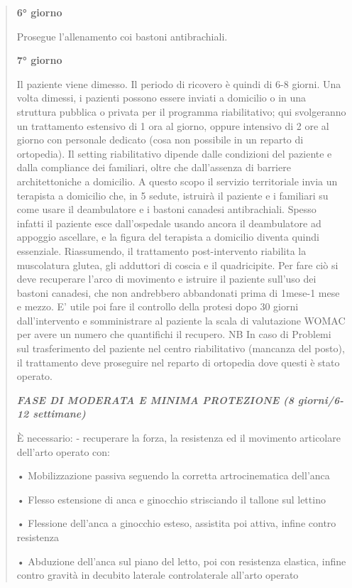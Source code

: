 \documentclass[]{article}
\begin{document}
\begin{quote}
\textbf{6° giorno}

Prosegue l'allenamento coi bastoni antibrachiali.

\textbf{7° giorno}

Il paziente viene dimesso. Il periodo di ricovero è quindi di 6-8
giorni. Una volta dimessi, i pazienti possono essere inviati a domicilio
o in una struttura pubblica o privata per il programma riabilitativo;
qui svolgeranno un trattamento estensivo di 1 ora al giorno, oppure
intensivo di 2 ore al giorno con personale dedicato (cosa non possibile
in un reparto di ortopedia). Il setting riabilitativo dipende dalle
condizioni del paziente e dalla compliance dei familiari, oltre che
dall'assenza di barriere architettoniche a domicilio. A questo scopo il
servizio territoriale invia un terapista a domicilio che, in 5 sedute,
istruirà il paziente e i familiari su come usare il deambulatore e i
bastoni canadesi antibrachiali. Spesso infatti il paziente esce
dall'ospedale usando ancora il deambulatore ad appoggio ascellare, e la
figura del terapista a domicilio diventa quindi essenziale. Riassumendo,
il trattamento post-intervento riabilita la muscolatura glutea, gli
adduttori di coscia e il quadricipite. Per fare ciò si deve recuperare
l'arco di movimento e istruire il paziente sull'uso dei bastoni
canadesi, che non andrebbero abbandonati prima di 1mese-1 mese e mezzo.
E' utile poi fare il controllo della protesi dopo 30 giorni
dall'intervento e somministrare al paziente la scala di valutazione
WOMAC per avere un numero che quantifichi il recupero. NB In caso di
Problemi sul trasferimento del paziente nel centro riabilitativo
(mancanza del posto), il trattamento deve proseguire nel reparto di
ortopedia dove questi è stato operato.

\textbf{\emph{FASE DI MODERATA E MINIMA PROTEZIONE (8 giorni/6-12
settimane) }}

È necessario: - recuperare la forza, la resistenza ed il movimento
articolare dell'arto operato con:

• Mobilizzazione passiva seguendo la corretta artrocinematica dell'anca

• Flesso estensione di anca e ginocchio strisciando il tallone sul
lettino

• Flessione dell'anca a ginocchio esteso, assistita poi attiva, infine
contro resistenza

• Abduzione dell'anca sul piano del letto, poi con resistenza elastica,
infine contro gravità in decubito laterale controlaterale all'arto
operato


\end{quote}
\end{document}
